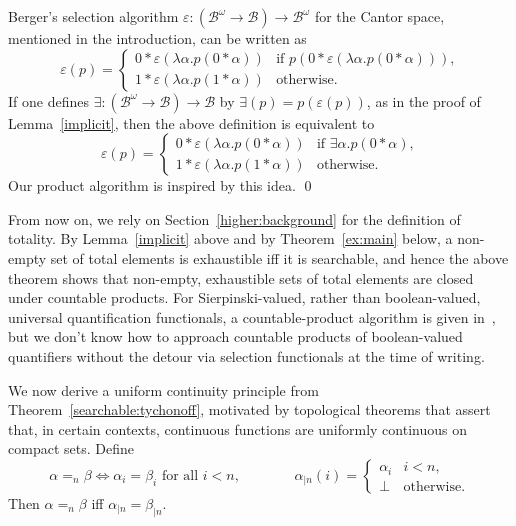 \documentclass{LMCS}
\newcommand{\e}{\varepsilon}
\newcommand{\myomega}{\omega}
\newcommand{\pBool}{\mathcal{B}}
\newcommand{\True}{1}\newcommand{\False}{0}\newcommand{\domain}[1]{{\D_{#1}}}
\newcommand{\D}{D}
\begin{document}
\begin{rem}
  Berger's selection algorithm  $\e \colon (\pBool^\myomega \to \pBool) \to \pBool^\myomega$ for
the Cantor space, mentioned in the introduction, can
be written as
\[
\e(p) = 
\begin{cases}
\False  * \e(\lambda \alpha.p(\False * \alpha)) & \text{if $p(\False * \e(\lambda \alpha.p(\False  * \alpha)))$,} \\
\True *  \e(\lambda \alpha.p(\True *  \alpha)) & \text{otherwise.}
\end{cases}
\]
If one defines $\exists \colon (\pBool^\myomega \to \pBool) \to \pBool$ by
$\exists(p) = p(\e(p))$, as in the proof of Lemma~\ref{implicit},
then the above definition is equivalent to
\[
\e(p) = 
\begin{cases}
\False  * \e(\lambda \alpha.p(\False *  \alpha)) & \text{if $\exists \alpha. p(\False * \alpha)$,} \\
\True *  \e(\lambda \alpha.p(\True *  \alpha)) & \text{otherwise.}
\end{cases}
\]
Our product algorithm is inspired by this idea. \qed
\end{rem}

\medskip From now on, we rely on Section~\ref{higher:background} for
the definition of totality.  
By Lemma~\ref{implicit} above and by Theorem~\ref{ex:main} below, a
non-empty set of total elements is exhaustible iff it is searchable,
and hence the above theorem shows that non-empty, exhaustible sets of
total elements are closed under countable products. For
Sierpinski-valued, rather than boolean-valued, universal
quantification functionals, a countable-product algorithm is given
in~\cite{escardo:barbados}, but we don't know how to approach
countable products of boolean-valued quantifiers without the detour
via selection functionals at the time of writing.

We now derive a uniform continuity principle from
Theorem~\ref{searchable:tychonoff}, motivated by topological theorems
that assert that, in certain contexts, continuous functions are
uniformly continuous on compact sets. Define
\[
\text{$\alpha =_n \beta \iff \alpha_i = \beta_i$ for all
    $i<n$,} \qquad\qquad \alpha_{|n}(i)=\begin{cases}
    \alpha_i & \text{$i < n$,}\\
    \bot & \text{otherwise.}\end{cases}
\] 
Then $\alpha =_n \beta$ iff $\alpha_{|n} = \beta_{|n}$.
\end{document}

